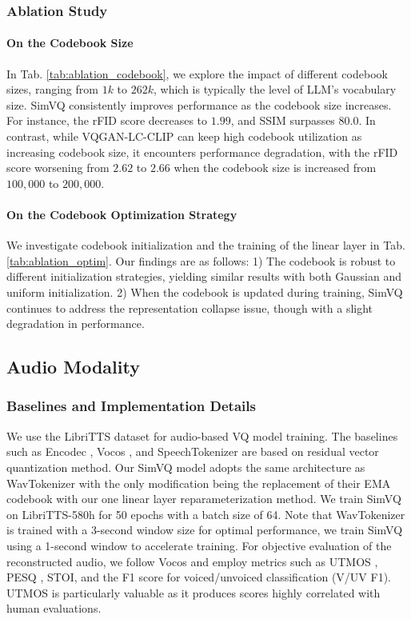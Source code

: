 \subsubsection{Ablation Study}

\paragraph{On the Codebook Size} 
In Tab. \ref{tab:ablation_codebook}, we explore the impact of different codebook sizes, ranging from $1k$ to $262k$, which is typically the level of LLM's vocabulary size. SimVQ consistently improves performance as the codebook size increases. For instance, the rFID score decreases to $1.99$, and SSIM surpasses $80.0$. In contrast, while VQGAN-LC-CLIP can keep high codebook utilization as increasing codebook size, it encounters performance degradation, with the rFID score worsening from $2.62$ to $2.66$ when the codebook size is increased from $100,000$ to $200,000$. 


\paragraph{On the Codebook Optimization Strategy}
We investigate codebook initialization and the training of the linear layer in Tab. \ref{tab:ablation_optim}. Our findings are as follows: 1) The codebook is robust to different initialization strategies, yielding similar results with both Gaussian and uniform initialization. 2) When the codebook is updated during training, SimVQ continues to address the representation collapse issue, though with a slight degradation in performance.





\subsection{Audio Modality}


\subsubsection{Baselines and Implementation Details}

We use the LibriTTS dataset \cite{zen2019libritts} for audio-based VQ model training.  The baselines such as Encodec \cite{efossez2023high}, Vocos \cite{siuzdak2024vocos}, and SpeechTokenizer \cite{zhang2024speechtokenizer} are based on residual vector quantization method. Our SimVQ model adopts the same architecture as WavTokenizer \cite{ji2024wavtokenizer} with the only modification being the replacement of their EMA codebook with our one linear layer reparameterization method. We train SimVQ on LibriTTS-580h for 50 epochs with a batch size of 64. Note that WavTokenizer is trained with a 3-second window size for optimal performance, we train SimVQ using a 1-second window to accelerate training. For objective evaluation of the reconstructed audio, we follow Vocos \cite{siuzdak2024vocos} and employ metrics such as UTMOS \cite{Saeki2022UTMOSUS}, PESQ \cite{941023}, STOI, and the F1 score for voiced/unvoiced classification (V/UV F1). UTMOS is particularly valuable as it produces scores highly correlated with human evaluations.

